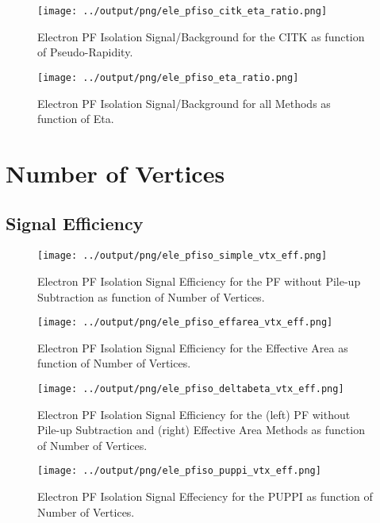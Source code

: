 \documentclass[11pt]{book}
\begin{document}
\begin{figure}[htb]
\centering
\texttt{[image: ../output/png/ele\_pfiso\_citk\_eta\_ratio.png]}
\caption{Electron PF Isolation Signal/Background for the CITK as function of Pseudo-Rapidity.}
\label{fig:ele_pfiso_eta_ratio_citk}
\end{figure}

\begin{figure}[htb]
\centering
\texttt{[image: ../output/png/ele\_pfiso\_eta\_ratio.png]}
\caption{Electron PF Isolation Signal/Background for all Methods as function of Eta.}
\label{fig:ele_pfiso_eta_ratio}
\end{figure}
\clearpage

\section{Number of Vertices}
\subsection{Signal Efficiency}
\begin{figure}[htb]
\centering
\texttt{[image: ../output/png/ele\_pfiso\_simple\_vtx\_eff.png]}
\caption{Electron PF Isolation Signal Efficiency for the PF without Pile-up Subtraction as function of Number of Vertices.}
\label{fig:ele_pfiso_vtx_eff_simple}
\end{figure}

\begin{figure}[htb]
\centering
\texttt{[image: ../output/png/ele\_pfiso\_effarea\_vtx\_eff.png]}
\caption{Electron PF Isolation Signal Efficiency for the Effective Area as function of Number of Vertices.}
\label{fig:ele_pfiso_vtx_eff_effarea}
\end{figure}

\begin{figure}[htb]
\centering
\texttt{[image: ../output/png/ele\_pfiso\_deltabeta\_vtx\_eff.png]}
\caption{Electron PF Isolation Signal Efficiency for the (left) PF without Pile-up Subtraction and (right) Effective Area Methods as function of Number of Vertices.}
\label{fig:ele_pfiso_vtx_eff_deltabeta}
\end{figure}

\begin{figure}[htb]
\centering
\texttt{[image: ../output/png/ele\_pfiso\_puppi\_vtx\_eff.png]}
\caption{Electron PF Isolation Signal Effeciency for the PUPPI as function of Number of Vertices.}
\label{fig:ele_pfiso_vtx_eff_puppi}
\end{figure}
\end{document}
